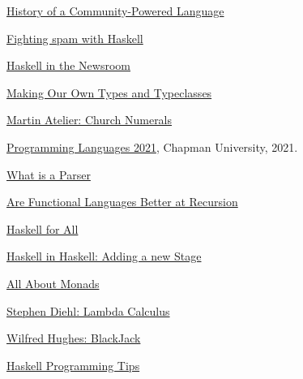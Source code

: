 \documentclass{article}
\begin{document}
\clearpage
\begin{thebibliography}{99}

\href{https://serokell.io/blog/haskell-history}{History of a Community-Powered Language}

\href{https://engineering.fb.com/2015/06/26/security/fighting-spam-with-haskell/}{Fighting spam with Haskell}

{\href{https://www.infoq.com/presentations/haskell-newsroom-nyt/}{Haskell in the Newsroom}}

\href{http://learnyouahaskell.com/making-our-own-types-and-typeclasses}{Making Our Own Types and Typeclasses}

\href{https://mjoldfield.com/atelier/2011/01/church-numerals.html}{Martin Atelier: Church Numerals}

\href{https://github.com/alexhkurz/programming-languages-2021/blob/main/README.md}{Programming Languages 2021}, Chapman University, 2021.

\href{https://www.techopedia.com/definition/3854/parser}{What is a Parser}

\href{https://softwareengineering.stackexchange.com/questions/149167/are-functional-languages-better-at-recursion}{Are Functional Languages Better at Recursion}

\href{https://www.haskellforall.com/2012/10/parsing-chemical-substructures.html}{Haskell for All}

\href{https://cronokirby.com/posts/2020/12/haskell-in-haskell-3/}{Haskell in Haskell: Adding a new Stage}

\href{https://wiki.haskell.org/All_About_Monads}{All About Monads}

\href{http://dev.stephendiehl.com/fun/lambda_calculus.html}{Stephen Diehl: Lambda Calculus}

\href{https://github.com/Wilfred/Blackjack/blob/master/Blackjack.hs}{
Wilfred Hughes: BlackJack}

\href{https://wiki.haskell.org/Haskell_programming_tips}{Haskell Programming Tips}

\end{thebibliography}
\end{document}
